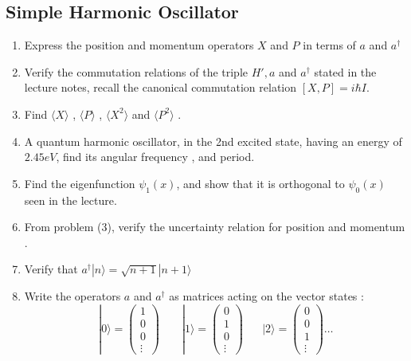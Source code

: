 \subsection{Simple Harmonic Oscillator}
\begin{enumerate}
	\item Express the position and momentum operators $X$ and $P$ in terms of $a$ and $ a^\dagger$
	\item Verify the commutation relations of the triple $ H', a $ and $ a^\dagger$ stated in the lecture notes, recall the canonical commutation relation $ [ X,P]= i \hbar I$.
	\item Find $ \langle X\rangle$ , $ \langle P\rangle$  , $ \langle X^2\rangle$ and $ \langle P^2\rangle$ .
	\item A quantum harmonic oscillator, in the 2nd excited state, having an energy of $ 2.45 eV$, find its angular frequency , and period.  
	\item Find the eigenfunction $ \psi_1(x)$, and show that it is orthogonal to $ \psi_0(x)$ seen in the lecture.
	\item From problem (3), verify the uncertainty relation for position and momentum . 
	\item  Verify that $ a^\dagger |n\rangle  = \sqrt{n+1} |n+1\rangle $ 
	\item   Write the operators $ a$ and $a^\dagger$ as matrices  acting on the vector states :
	\[ |0\rangle = \begin{pmatrix}
	1\\0\\0\\ \vdots
	\end{pmatrix} \; \; \; \; \; \; \; |1\rangle = \begin{pmatrix}
	0\\1\\0\\ \vdots
	\end{pmatrix} \; \; \; \; \; \;  |2\rangle = \begin{pmatrix}
	0\\0\\1\\ \vdots
	\end{pmatrix} \dots \]
\end{enumerate}
\nocite{*} 
